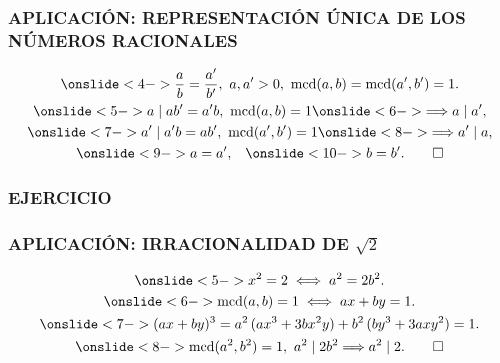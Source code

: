 \begin{frame}
  \frametitle{APLICACIÓN: REPRESENTACIÓN ÚNICA DE LOS NÚMEROS RACIONALES}



  \begin{gather*}
    \onslide<4->{\frac{a}{b} = \frac{a'}{b'}, ~ a, a' > 0, ~ \mcd (a,b) = \mcd (a',b') = 1.} \\
    \onslide<5->{a \mid ab' = a'b, ~ \mcd (a,b) = 1}
    \onslide<6->{\Longrightarrow a \mid a',} \\
    \onslide<7->{a' \mid a'b = ab', ~ \mcd (a',b') = 1}
    \onslide<8->{\Longrightarrow a' \mid a,} \\
    \onslide<9->{a = a',} \quad \onslide<10->{b = b'. \qed}
  \end{gather*}
\end{frame}

\begin{frame}
  \frametitle{EJERCICIO}

\end{frame}

\begin{frame}
  \frametitle{APLICACIÓN: IRRACIONALIDAD DE $\sqrt{2}$}




  \begin{gather*}
    \onslide<5->{x^2 = 2 \iff a^2 = 2b^2.} \\
    \onslide<6->{\mcd(a,b) = 1 \iff ax + by = 1.} \\
    \onslide<7->{(ax+by)^3 = a^2\,(a x^3 + 3 b x^2 y) + b^2\,(b y^3 + 3 a x y^2) = 1.} \\
    \onslide<8->{\mcd (a^2,b^2) = 1, ~ a^2 \mid 2b^2 \Longrightarrow a^2 \mid 2. \qed}
  \end{gather*}
\end{frame}

